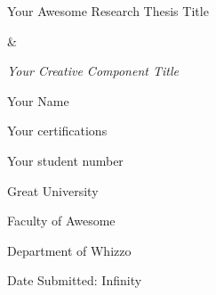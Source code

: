 \documentclass[a4paper]{memoir}
\begin{document}
\frontmatter

\vspace*{2.5cm}
\begin{center}
    \huge{Your Awesome Research Thesis Title}

    \huge{\&}

    \emph{\huge{Your Creative Component Title}}


\vspace{2.5cm}
    \Large{Your Name}

    \normalsize{Your certifications}

    Your student number

\vspace{2cm}
    \Large{Great University}

    \normalsize{Faculty of Awesome}

    Department of Whizzo

    Date Submitted: Infinity


\end{center}


\pagebreak



\pagebreak 

\tableofcontents
\label{contents}

\pagebreak

\mainmatter


\backmatter
\end{document}
